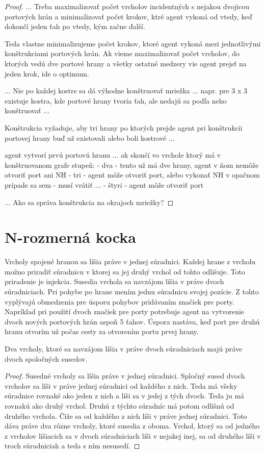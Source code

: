 \begin{proof}
...
Treba maximalizovať počet vrcholov incidentných s nejakou dvojicou portových
 hrán a minimalizovať počet krokov, ktré agent vykoná od vtedy, keď dokončí
jeden ťah po vtedy, kým začne ďalší.

Teda vlastne minimalizujeme počet krokov, ktoré agent vykoná mezi
jednotlivými konštrukciami portových hrán. Ak vieme maximalizovať počet
vrcholov, do ktorých vedú dve portové hrany a všetky ostatné medzery vie
agent prejsť na jeden krok, ide o optimum.

...
Nie po každej kostre sa dá výhodne konštruovať mriežka ...
napr. pre 3 x 3 existuje kostra, kde portové hrany tvoria ťah, ale nedajú sa
podľa neho konštruovať ...

Konštrukcia vyžaduje, aby tri hrany po ktorých prejde agent pri konštrukcii
portovej hrany buď už existovali alebo boli kostrové ...

agent vytvorí prvú portovú hranu ... ak skončí vo vrchole ktorý má v
konštruovanom grafe stupeň:
- dva - tento už má dve hrany, agent v ňom nemôže otvoriť port ani NH
- tri - agent môže otvoriť port, alebo vykonať NH v opačnom prípade sa sem
- musí vrátiť ...
- štyri - agent môže otvoriť port

...
Ako sa správa konštrukcia na okrajoch mriežky?

\end{proof}




\section{N-rozmerná kocka}
Vrcholy spojené hranou sa líšia práve v jednej súradnici. Každej hrane z
vrcholu možno priradiť súradnicu v ktorej sa jej druhý vrchol od tohto
odlišuje. Toto priradenie je injekcia.
Susedia vrchola sa navzájom líšia v práve dvoch súradniciach. Pri pohybe po
hrane mením jednu súradnicu svojej pozície. Z tohto vyplývajú obmedzenia
pre úsporu pohybov pridávaním značiek pre porty. Napríklad pri použití dvoch
značiek pre porty potrebuje agent na vytvorenie dvoch nových portových hrán
aspoň 5 ťahov. Úspora nastáva, keď port pre druhú hranu otvorím už počas
cesty za otvorením portu prvej hrany.

\begin{lem}
Dva vrcholy, ktoré sa navzájom líšia v práve dvoch súradniciach majú práve dvoch
spoločných susedov.
\end{lem}
\begin{proof}
Susedné vrcholy sa líšia práve v jednej súradnici. Spločný sused dvoch
vrcholov sa líši v práve jednej súradnici od každého z nich. Teda má všeky
súradnice rovnaké ako jeden z nich a líši sa v jedej z tých dvoch. Teda ju
má rovnakú ako druhý vrchol. Druhú z týchto súradníc má potom odlišnú od
druhého vrchola. Čiže sa od každého z nich líši v práve jednej súradnici.
Toto dáva práve dva rôzne vrcholy, ktoré susedia z oboma. Vrchol, ktorý
sa od jedného z vrcholov líšiacich sa v dvoch súradniciach líši v nejakej
inej, sa od druhého líši v troch súradniciah a teda s ním nesusedí.
\end{proof}

